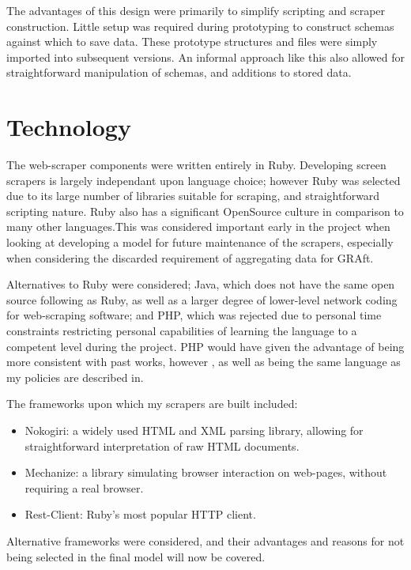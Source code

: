 The advantages of this design were primarily to simplify scripting and scraper construction. Little setup was required during prototyping to construct schemas against which to save data. These prototype structures and files were simply imported into subsequent versions. An informal approach like this also allowed for straightforward manipulation of schemas, and additions to stored data. 

\section{Technology}

The web-scraper components were written entirely in Ruby. Developing screen scrapers is largely independant upon language choice; however Ruby was selected due to its large number of libraries suitable for scraping, and straightforward scripting nature. Ruby also has a significant OpenSource culture in comparison to many other languages.This was considered important early in the project when looking at developing a model for future maintenance of the scrapers, especially when considering the discarded requirement of aggregating data for GRAft. 

Alternatives to Ruby were considered; Java, which does not have the same open source following as Ruby, as well as a larger degree of lower-level network coding for web-scraping software; and PHP, which was rejected due to personal time constraints restricting personal capabilities of learning the language to a competent level during the project. PHP would have given the advantage of being more consistent with past works, however \cite{GRAft}, as well as being the same language as my policies are described in. 

The frameworks upon which my scrapers are built included:

\begin{itemize}
 \item Nokogiri: a widely used HTML and XML parsing library, allowing for straightforward interpretation of raw HTML documents.
 \item Mechanize: a library simulating browser interaction on web-pages, without requiring a real browser.
 \item Rest-Client: Ruby's most popular HTTP client.
\end{itemize}

Alternative frameworks were considered, and their advantages and reasons for not being selected in the final model will now be covered.

